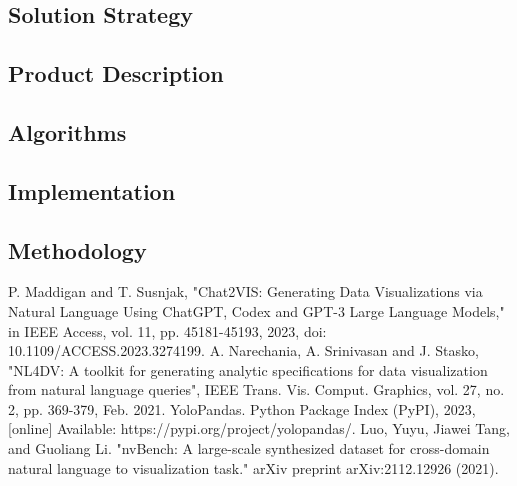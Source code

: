 \documentclass[conference]{IEEEtran}
\begin{document}
    \subsection{Solution Strategy}
    \subsection{Product Description}
    \subsection{Algorithms}
    \subsection{Implementation}
    \subsection{Methodology}



\begin{thebibliography}{00}
     P. Maddigan and T. Susnjak, "Chat2VIS: Generating Data Visualizations via Natural Language Using ChatGPT, Codex and GPT-3 Large Language Models," in IEEE Access, vol. 11, pp. 45181-45193, 2023, doi: 10.1109/ACCESS.2023.3274199.
     A. Narechania, A. Srinivasan and J. Stasko, "NL4DV: A toolkit for generating analytic specifications for data visualization from natural language queries", IEEE Trans. Vis. Comput. Graphics, vol. 27, no. 2, pp. 369-379, Feb. 2021.
     YoloPandas. Python Package Index (PyPI), 2023, [online] Available: https://pypi.org/project/yolopandas/.
     Luo, Yuyu, Jiawei Tang, and Guoliang Li. "nvBench: A large-scale synthesized dataset for cross-domain natural language to visualization task." arXiv preprint arXiv:2112.12926 (2021).
\end{thebibliography}
\end{document}
